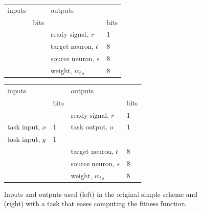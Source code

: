 \documentclass[12pt]{article}
\begin{document}
\begin{figure}[ht]
  \begin{minipage}[b]{0.45\linewidth}
  \centering
    \begin{tabular}{@{}llll@{}}
    \toprule
    inputs             &           & outputs & \\
    \cmidrule(rl{0em}){1-2}          \cmidrule(rl{0em}){3-4}
                       & bits      &         & bits \\
    \midrule
                       &           & ready signal, $r$     & 1 \\
                       &           & target neuron, $t$   & 8 \\
                       &           & source neuron, $s$   & 8 \\
                       &           & weight, $w_{t \, s}$ & 8 \\
    \bottomrule
    \end{tabular}
  \end{minipage}
  \hspace{\fill}
  \begin{minipage}[b]{0.45\linewidth}
    \centering
    \begin{tabular}{@{}llll@{}}
    \toprule
    inputs             &           & outputs & \\
    \cmidrule(rl{0em}){1-2}          \cmidrule(rl{0em}){3-4}
                       & bits      &         & bits \\
    \midrule
                       &           & ready signal, $r$    & 1 \\
    task input, $x$    & 1         & task output, $o$     & 1 \\
    task input, $y$    & 1         &                      &   \\
                       &           & target neuron, $t$   & 8 \\
                       &           & source neuron, $s$   & 8 \\
                       &           & weight, $w_{t \, s}$ & 8 \\
    \bottomrule
    \end{tabular}
  \end{minipage}
  \caption{Inputs and outputs used
    (left) in the original simple scheme
    and (right) with a task that eases
    computing the fitness function.}
  \label{arbitraryio}
\end{figure}
\end{document}
